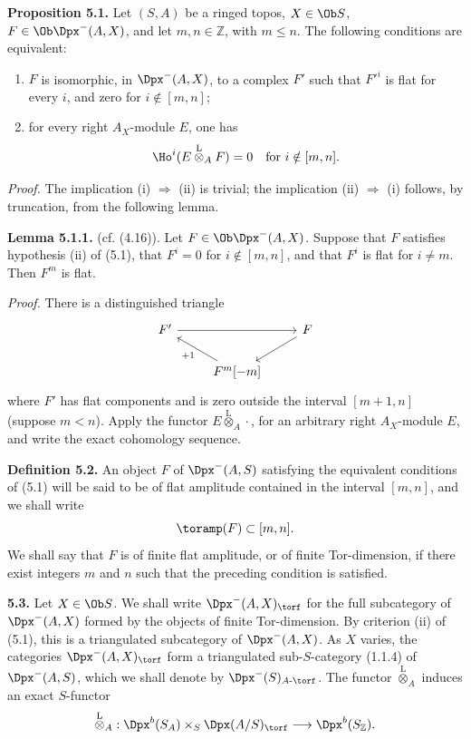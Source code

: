 \textbf{Proposition 5.1.} Let \((S,A)\) be a ringed topos, \(X\in\Ob S\), \(F\in\Ob\Dpx^-(A,X)\), and let \(m,n\in\mathbb Z\), with \(m\leq n\). The following conditions are equivalent:
\begin{enumerate}[label=(\roman*)]
\item \(F\) is isomorphic, in \(\Dpx^-(A,X)\), to a complex \(F'\) such that \(F'^i\) is flat for every \(i\), and zero for \(i\notin[m,n]\);
\item for every right \(A_X\)-module \(E\), one has
\[
  \Ho^i(E\overset{\mathrm L}{\otimes}_A F)=0\quad\text{for }i\notin[m,n].
\]
\end{enumerate}

\emph{Proof.} The implication (i) \(\Rightarrow\) (ii) is trivial; the implication (ii) \(\Rightarrow\) (i) follows, by truncation, from the following lemma.

\textbf{Lemma 5.1.1.} (cf. (4.16)). Let \(F\in\Ob\Dpx^-(A,X)\). Suppose that \(F\) satisfies hypothesis (ii) of (5.1), that \(F^i=0\) for \(i\notin[m,n]\), and that \(F^i\) is flat for \(i\ne m\). Then \(F^m\) is flat.

\emph{Proof.} There is a distinguished triangle
\[
\begin{tikzcd}
F' \arrow[rr] && F \arrow[dl]\\
& F^m[-m] \arrow[ul,"+1"] &
\end{tikzcd}
\]
where \(F'\) has flat components and is zero outside the interval \([m+1,n]\) (suppose \(m<n\)). Apply the functor \(E\overset{\mathrm L}{\otimes}_A\cdot\), for an arbitrary right \(A_X\)-module \(E\), and write the exact cohomology sequence.

\textbf{Definition 5.2.} An object \(F\) of \(\Dpx^-(A,S)\) satisfying the equivalent conditions of (5.1) will be said to be of flat amplitude contained in the interval \([m,n]\), and we shall write
\[
  \toramp(F)\subset[m,n].
\]
We shall say that \(F\) is of finite flat amplitude, or of finite Tor-dimension, if there exist integers \(m\) and \(n\) such that the preceding condition is satisfied.

\textbf{5.3.} Let \(X\in\Ob S\). We shall write \(\Dpx^-(A,X)_{\torf}\) for the full subcategory of \(\Dpx^-(A,X)\) formed by the objects of finite Tor-dimension. By criterion (ii) of (5.1), this is a triangulated subcategory of \(\Dpx^-(A,X)\). As \(X\) varies, the categories \(\Dpx^-(A,X)_{\torf}\) form a triangulated sub-\(S\)-category (1.1.4) of \(\Dpx^-(A,S)\), which we shall denote by \(\Dpx^-(S)_{A\text{-}\torf}\). The functor \(\overset{\mathrm L}{\otimes}_A\) induces an exact \(S\)-functor
\[
  \overset{\mathrm L}{\otimes}_A:
  \Dpx^b(S_A)\times_S \Dpx(A/S)_{\torf}
  \longrightarrow \Dpx^b(S_{\mathbb Z}).
\]

